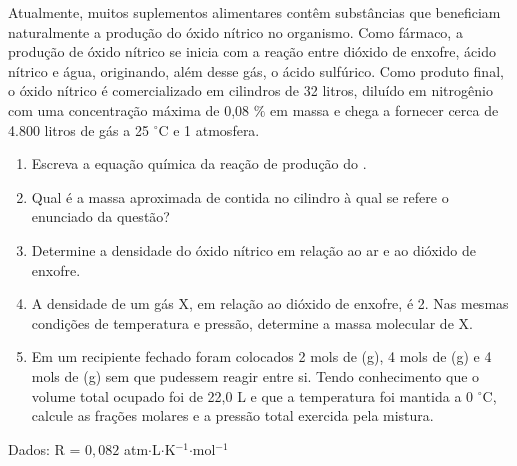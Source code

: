 Atualmente, muitos suplementos alimentares contêm substâncias que beneficiam naturalmente a produção do óxido nítrico no organismo. Como fármaco, a produção de óxido nítrico se inicia com a reação entre dióxido de enxofre, ácido nítrico e água, originando, além desse gás, o ácido sulfúrico. Como produto final, o óxido nítrico é comercializado em cilindros de 32 litros, diluído em nitrogênio com uma concentração máxima de 0,08 $\%$ em massa e chega a fornecer cerca de 4.800 litros de gás a 25 $^\circ$C e 1 atmosfera. 

\begin{enumerate}[label = (\alph*)]
	\item Escreva a equação química da reação de produção do .
	\item Qual é a massa aproximada de  contida no cilindro à qual se refere o enunciado da questão?
	\item Determine a densidade do óxido nítrico em relação ao ar e ao dióxido de enxofre. 
	\item A densidade de um gás X, em relação ao dióxido de enxofre, é 2. Nas mesmas condições de temperatura e pressão, determine a massa molecular de X. 
	\item  Em um recipiente fechado foram colocados 2 mols de (g), 4 mols de (g) e 4 mols de (g) sem que pudessem reagir entre si. Tendo conhecimento que o volume total ocupado foi de 22,0 L e que a temperatura foi mantida a 0 $^\circ$C, calcule as frações molares e a pressão total exercida pela mistura. 
\end{enumerate}

Dados: R = $0,082$ atm$\cdot$L$\cdot$K$^{-1}$$\cdot$mol$^{-1}$